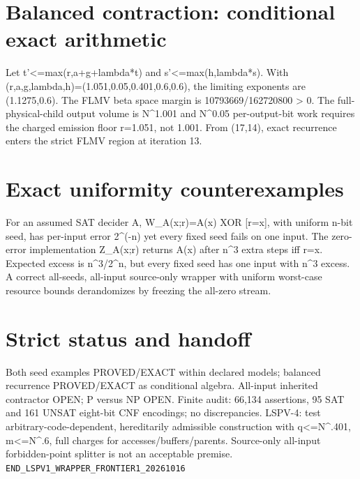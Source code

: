 \section*{Balanced contraction: conditional exact arithmetic}
Let t'<=max(r,a+g+lambda*t) and s'<=max(h,lambda*s).
With (r,a,g,lambda,h)=(1.051,0.05,0.401,0.6,0.6),
the limiting exponents are (1.1275,0.6).
The FLMV beta space margin is 10793669/162720800 > 0.
The full-physical-child output volume is N^1.001 and N^0.05 per-output-bit work requires the charged emission floor r=1.051, not 1.001.
From (17,14), exact recurrence enters the strict FLMV region at iteration 13.
\section*{Exact uniformity counterexamples}
For an assumed SAT decider A, W_A(x;r)=A(x) XOR [r=x], with uniform n-bit seed, has per-input error 2^(-n) yet every fixed seed fails on one input.
The zero-error implementation Z_A(x;r) returns A(x) after n^3 extra steps iff r=x. Expected excess is n^3/2^n, but every fixed seed has one input with n^3 excess.
A correct all-seeds, all-input source-only wrapper with uniform worst-case resource bounds derandomizes by freezing the all-zero stream.
\section*{Strict status and handoff}
Both seed examples PROVED/EXACT within declared models; balanced recurrence PROVED/EXACT as conditional algebra. All-input inherited contractor OPEN; P versus NP OPEN.
Finite audit: 66,134 assertions, 95 SAT and 161 UNSAT eight-bit CNF encodings; no discrepancies.
LSPV-4: test arbitrary-code-dependent, hereditarily admissible construction with q<=N^.401, m<=N^.6, full charges for accesses/buffers/parents. Source-only all-input forbidden-point splitter is not an acceptable premise.
\texttt{END_LSPV1_WRAPPER_FRONTIER1_20261016}
